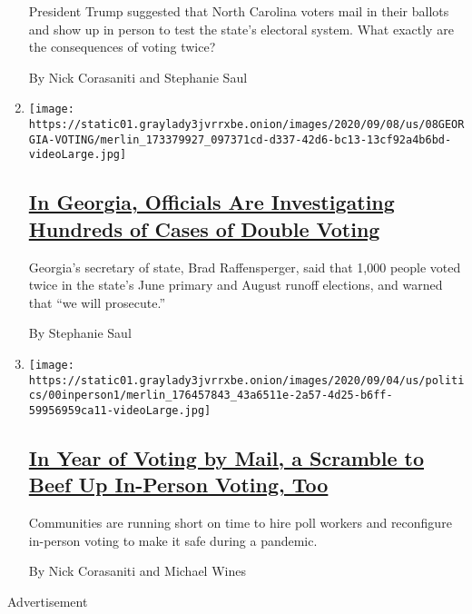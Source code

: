 \begin{enumerate}
  President Trump suggested that North Carolina voters mail in their
  ballots and show up in person to test the state's electoral system.
  What exactly are the consequences of voting twice?

  By Nick Corasaniti and Stephanie Saul
\item
  \texttt{[image: https://static01.graylady3jvrrxbe.onion/images/2020/09/08/us/08GEORGIA-VOTING/merlin\_173379927\_097371cd-d337-42d6-bc13-13cf92a4b6bd-videoLarge.jpg]}

  \hypertarget{in-georgia-officials-are-investigating-hundreds-of-cases-of-double-voting}{%
  \subsection{\texorpdfstring{\href{/2020/09/08/us/politics/georgia-double-voting.html}{In
  Georgia, Officials Are Investigating Hundreds of Cases of Double
  Voting}}{In Georgia, Officials Are Investigating Hundreds of Cases of Double Voting}}\label{in-georgia-officials-are-investigating-hundreds-of-cases-of-double-voting}}

  Georgia's secretary of state, Brad Raffensperger, said that 1,000
  people voted twice in the state's June primary and August runoff
  elections, and warned that ``we will prosecute.''

  By Stephanie Saul
\item
  \texttt{[image: https://static01.graylady3jvrrxbe.onion/images/2020/09/04/us/politics/00inperson1/merlin\_176457843\_43a6511e-2a57-4d25-b6ff-59956959ca11-videoLarge.jpg]}

  \hypertarget{in-year-of-voting-by-mail-a-scramble-to-beef-up-in-person-voting-too}{%
  \subsection{\texorpdfstring{\href{/2020/09/07/us/politics/vote-in-person-covid.html}{In
  Year of Voting by Mail, a Scramble to Beef Up In-Person Voting,
  Too}}{In Year of Voting by Mail, a Scramble to Beef Up In-Person Voting, Too}}\label{in-year-of-voting-by-mail-a-scramble-to-beef-up-in-person-voting-too}}

  Communities are running short on time to hire poll workers and
  reconfigure in-person voting to make it safe during a pandemic.

  By Nick Corasaniti and Michael Wines
\end{enumerate}

Advertisement

